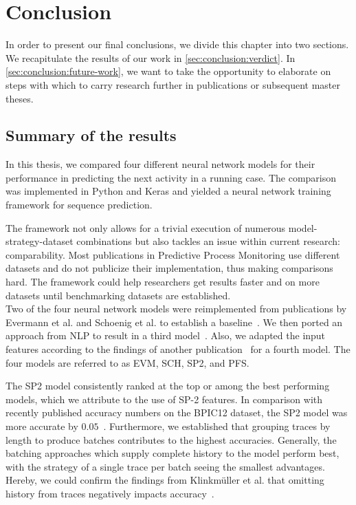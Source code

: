 \chapter{Conclusion} \label{chap:conclusion}
In order to present our final conclusions, we divide this chapter into two sections.
We recapitulate the results of our work in \autoref{sec:conclusion:verdict}.
In \autoref{sec:conclusion:future-work}, we want to take the opportunity to elaborate on steps with which to carry research further in publications or subsequent master theses.

\section{Summary of the results} \label{sec:conclusion:verdict}
In this thesis, we compared four different neural network models for their performance in predicting the next activity in a running case. The comparison was implemented in Python and Keras and yielded a neural network training framework for sequence prediction.

The framework not only allows for a trivial execution of numerous model-strategy-dataset combinations but also tackles an issue within current research: comparability. Most publications in Predictive Process Monitoring use different datasets and do not publicize their implementation, thus making comparisons hard. The framework could help researchers get results faster and on more datasets until benchmarking datasets are established.\\

Two of the four neural network models were reimplemented from publications by Evermann et al. and Schoenig et al. to establish a baseline~\cite{evermann2016, schoenig2018}. We then ported an approach from NLP to result in a third model~\cite{shibata2016bipartite}. Also, we adapted the input features according to the findings of another publication~\cite{klinkmuller2018reliablemonitoring} for a fourth model. The four models are referred to as EVM, SCH, SP2, and PFS.

The SP2 model consistently ranked at the top or among the best performing models, which we attribute to the use of SP-2 features. In comparison with recently published accuracy numbers on the BPIC12 dataset, the SP2 model was more accurate by $0.05$~\cite{boehmer2018probability, evermann2016}. Furthermore, we established that grouping traces by length to produce batches contributes to the highest accuracies. Generally, the batching approaches which supply complete history to the model perform best, with the strategy of a single trace per batch seeing the smallest advantages. Hereby, we could confirm the findings from Klinkmüller et al. that omitting history from traces negatively impacts accuracy~\cite{klinkmuller2018reliablemonitoring}.


